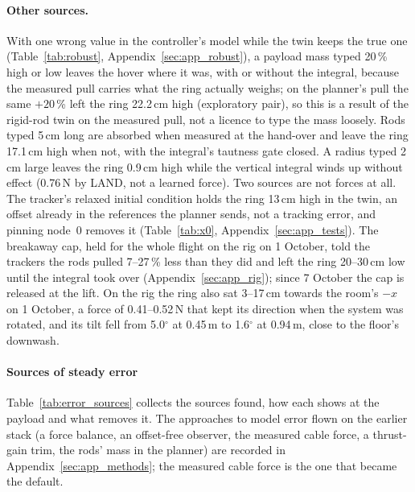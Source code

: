 \paragraph{Other sources.}
\label{sec:sim_robustness}
\label{sec:res_ic}
\label{sec:res_cap}
\label{sec:res_tilt}
With one wrong value in the controller's model while the twin keeps the true one (Table~\ref{tab:robust},
Appendix~\ref{sec:app_robust}), a payload mass typed 20\,\% high or low leaves the hover where it was, with or without
the integral, because the measured pull carries what the ring actually weighs; on the planner's pull the same $+20$\,\%
left the ring 22.2\,cm high (exploratory pair), so this is a result of the rigid-rod twin on the measured pull, not a
licence to type the mass loosely. Rods typed 5\,cm long are absorbed when measured at the hand-over and leave the ring
17.1\,cm high when not, with the integral's tautness gate closed. A radius typed 2\,cm large leaves the ring 0.9\,cm high
while the vertical integral winds up without effect (0.76\,N by LAND, not a learned force). Two sources are not forces
at all. The tracker's relaxed initial condition holds the ring 13\,cm high in the twin, an offset already in the
references the planner sends, not a tracking error, and pinning node~0 removes it (Table~\ref{tab:x0}, Appendix~\ref{sec:app_tests}). The breakaway cap,
held for the whole flight on the rig on 1 October, told the trackers the rods pulled 7--27\,\% less than they did and
left the ring 20--30\,cm low until the integral took over (Appendix~\ref{sec:app_rig}); since 7 October the cap is
released at the lift. On the rig the ring also sat
3--17\,cm towards the room's $-x$ on 1 October, a force of 0.41--0.52\,N that kept its direction when the system was
rotated, and its tilt fell from 5.0$^\circ$ at 0.45\,m to 1.6$^\circ$ at 0.94\,m, close to the floor's downwash.

\paragraph{Sources of steady error}

Table~\ref{tab:error_sources} collects the sources found, how each shows at the payload and what removes it. The
approaches to model error flown on the earlier stack (a force balance, an offset-free observer, the measured cable
force, a thrust-gain trim, the rods' mass in the planner) are recorded in Appendix~\ref{sec:app_methods}; the measured
cable force is the one that became the default.

